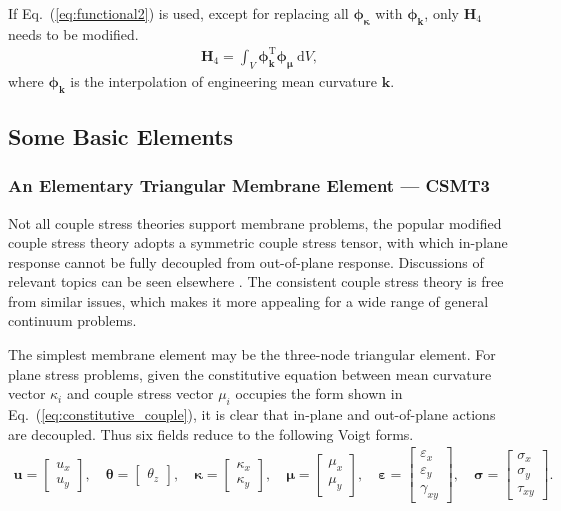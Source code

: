 \documentclass[3p,sort&compress,11pt,fleqn,review]{elsarticle}
\newcommand*{\eqsref}[1]{Eq.~(\ref{#1})}
\newcommand*{\mb}[1]{\boldsymbol{#1}}
\newcommand*{\mT}{\mathrm{T}}
\newcommand*{\md}[1]{\mathrm{d}#1}
\begin{document}
If \eqsref{eq:functional2} is used, except for replacing all $\mb{\phi}_{\mb{\kappa}}$ with $\mb{\phi}_{\mb{k}}$, only $\mb{H}_4$ needs to be modified.
\begin{gather}
\mb{H}_4=\int_V\mb{\phi}_{\mb{k}}^\mT\mb{\phi}_{\mb{\mu}}~\md{V},
\end{gather}
where $\mb{\phi}_{\mb{k}}$ is the interpolation of engineering mean curvature $\mb{k}$.
\subsection{Some Basic Elements}
\subsubsection{An Elementary Triangular Membrane Element --- CSMT3}
Not all couple stress theories support membrane problems, the popular modified couple stress theory \citep{Yang2002} adopts a symmetric couple stress tensor, with which in-plane response cannot be fully decoupled from out-of-plane response. Discussions of relevant topics can be seen elsewhere \citep{Hadjesfandiari2016}. The consistent couple stress theory is free from similar issues, which makes it more appealing for a wide range of general continuum problems.

The simplest membrane element may be the three-node triangular element. For plane stress problems, given the constitutive equation between mean curvature vector $\kappa_i$ and couple stress vector $\mu_i$ occupies the form shown in \eqsref{eq:constitutive_couple}, it is clear that in-plane and out-of-plane actions are decoupled. Thus six fields reduce to the following Voigt forms.
\begin{gather}
\mb{u}=\begin{bmatrix}
u_x\\u_y
\end{bmatrix},\quad
\mb{\theta}=\begin{bmatrix}
\theta_z
\end{bmatrix},\quad
\mb{\kappa}=\begin{bmatrix}
\kappa_x\\\kappa_y
\end{bmatrix},\quad
\mb{\mu}=\begin{bmatrix}
\mu_x\\\mu_y
\end{bmatrix},\quad
\mb{\varepsilon}=\begin{bmatrix}
\varepsilon_x\\\varepsilon_y\\\gamma_{xy}
\end{bmatrix},\quad
\mb{\sigma}=\begin{bmatrix}
\sigma_x\\\sigma_y\\\tau_{xy}
\end{bmatrix}.
\end{gather}
\end{document}
